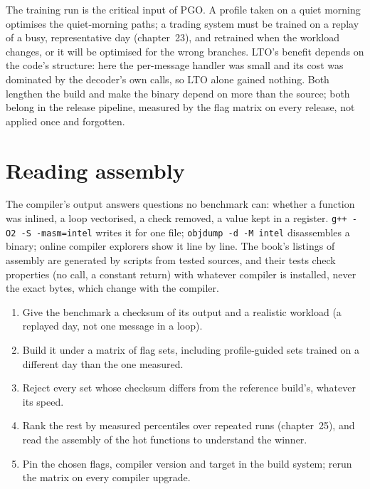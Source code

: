 The training run is the critical input of PGO. A profile taken on a quiet morning optimises the quiet-morning paths; a
trading system must be trained on a replay of a busy, representative day (chapter~23), and retrained when the workload
changes, or it will be optimised for the wrong branches. LTO's benefit depends on the code's structure: here the
per-message handler was small and its cost was dominated by the decoder's own calls, so LTO alone gained nothing. Both
lengthen the build and make the binary depend on more than the source; both belong in the release pipeline, measured by
the flag matrix on every release, not applied once and forgotten.

\section{Reading assembly}

The compiler's output answers questions no benchmark can: whether a function was inlined, a loop vectorised, a check
removed, a value kept in a register. \texttt{g++ -O2 -S -masm=intel} writes it for one file; \texttt{objdump -d
-M intel} disassembles a binary; online compiler explorers show it line by line. The book's listings of assembly are
generated by scripts from tested sources, and their tests check properties (no call, a constant return) with whatever
compiler is installed, never the exact bytes, which change with the compiler.

\begin{method}\label{met:ll:cpp-for-latency-iii-the-compiler:flags}
\begin{enumerate}
\item Give the benchmark a checksum of its output and a realistic workload (a replayed day, not one message in a loop).
\item Build it under a matrix of flag sets, including profile-guided sets trained on a different day than the one measured.
\item Reject every set whose checksum differs from the reference build's, whatever its speed.
\item Rank the rest by measured percentiles over repeated runs (chapter~25), and read the assembly of the hot functions to
understand the winner.
\item Pin the chosen flags, compiler version and target in the build system; rerun the matrix on every compiler upgrade.
\end{enumerate}
\end{method}

